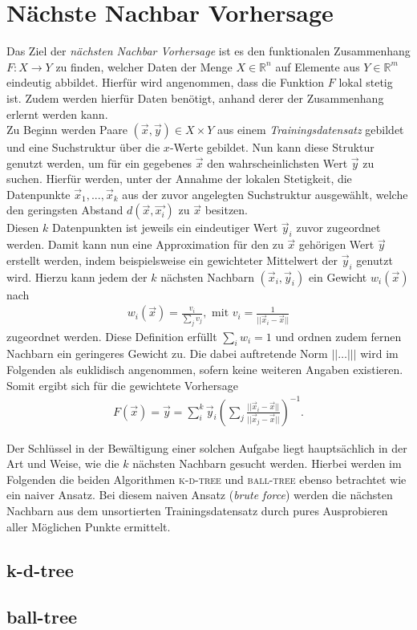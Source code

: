 \section{Nächste Nachbar Vorhersage}
Das Ziel der \textit{nächsten Nachbar Vorhersage} ist es den funktionalen Zusammenhang $F : X \rightarrow Y$ zu finden, welcher Daten der Menge $X \in \mathbb{R}^n$ auf Elemente aus $Y \in \mathbb{R}^m$ eindeutig abbildet. Hierfür wird angenommen, dass die Funktion $F$ lokal stetig ist. Zudem werden hierfür Daten benötigt, anhand derer der Zusammenhang erlernt werden kann.\\
Zu Beginn werden Paare $(\vec{x},\vec{y}) \in X \times Y$ aus einem \textit{Trainingsdatensatz} gebildet und eine Suchstruktur über die $x$-Werte gebildet. Nun kann diese Struktur genutzt werden, um für ein gegebenes $\vec{x}$ den wahrscheinlichsten Wert $\vec{y}$ zu suchen. Hierfür werden, unter der Annahme der lokalen Stetigkeit, die Datenpunkte $\vec{x}_1, ..., \vec{x}_k$ aus der zuvor angelegten Suchstruktur ausgewählt, welche den geringsten Abstand $d(\vec{x}, \vec{x_i})$ zu $\vec{x}$ besitzen.\\
Diesen $k$ Datenpunkten ist jeweils ein eindeutiger Wert $\vec{y}_i$ zuvor zugeordnet werden. Damit kann nun eine Approximation für den zu $\vec{x}$ gehörigen Wert $\vec{y}$ erstellt werden, indem beispielsweise ein gewichteter Mittelwert der $\vec{y}_i$ genutzt wird. Hierzu kann jedem der $k$ nächsten Nachbarn $(\vec{x}_i, \vec{y}_i)$ ein Gewicht $w_i(\vec{x})$ nach
\begin{align*}
w_i(\vec{x}) = \frac{v_i}{\sum_j v_j}, \text{ mit } v_i = \frac{1}{||\vec{x}_i-\vec{x}||} 
\end{align*}
zugeordnet werden. Diese Definition erfüllt $\sum_i w_i = 1$ und ordnen zudem fernen Nachbarn ein geringeres Gewicht zu. Die dabei auftretende Norm $||\ldots |||$ wird im Folgenden als euklidisch angenommen, sofern keine weiteren Angaben existieren. Somit ergibt sich für die gewichtete Vorhersage
\begin{align}
F(\vec{x}) = \vec{y} = \sum^k_i \vec{y}_i \left( \sum_j \frac{||\vec{x}_i-\vec{x}||}{||\vec{x}_j-\vec{x}||} \right) ^{-1}.
\end{align}

Der Schlüssel in der Bewältigung einer solchen Aufgabe liegt hauptsächlich in der Art und Weise, wie die $k$ nächsten Nachbarn gesucht werden. Hierbei werden im Folgenden die beiden Algorithmen \textsc{k-d-tree} und \textsc{ball-tree} ebenso betrachtet wie ein naiver Ansatz. Bei diesem naiven Ansatz (\textit{brute force}) werden die nächsten Nachbarn aus dem unsortierten Trainingsdatensatz durch pures Ausprobieren aller Möglichen Punkte ermittelt.

\subsection{k-d-tree}

\subsection{ball-tree}